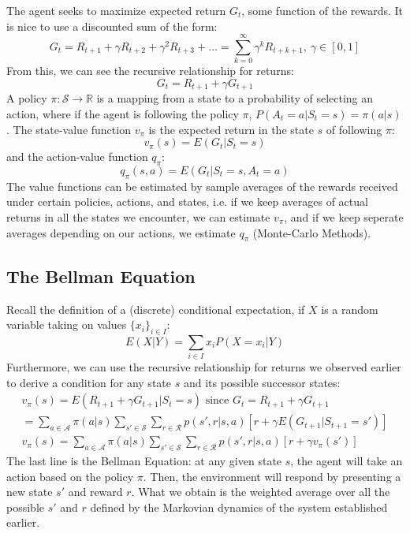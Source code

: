 \documentclass[12pt, reqno]{article}
\theoremstyle{plain}    \newtheorem{theorem}{Theorem}[section]
\theoremstyle{plain}    \newtheorem{lemma}[theorem]{Lemma}
\theoremstyle{plain}    \newtheorem{claim}[theorem]{Claim}
\theoremstyle{plain}    \newtheorem{definition}{Definition}[section]
\theoremstyle{plain}    \newtheorem{proposition}[theorem]{Proposition}
\theoremstyle{plain}    \newtheorem{corollary}[theorem]{Corollary}
\theoremstyle{plain}    \newtheorem{example}[definition]{Example}
\newcommand{\RR}{\mathbb R}
\numberwithin{equation}{section}
\begin{document}
The agent seeks to maximize expected return \(G_t\), some function of the
rewards. It is nice to use a discounted sum of the form:
\[G_t = R_{t+1} + \gamma R_{t+2} + \gamma^2 R_{t+3} + \dots =
\sum_{k=0}^{\infty}\gamma^k R_{t+k+1}, \ \gamma \in [0,1]\]
From this, we can see the recursive relationship for returns:
\[G_t = R_{t+1} + \gamma G_{t+1}\]
A policy \(\pi: \mathcal{S} \to \RR\) is a mapping from a state to a
probability of selecting an action, where if the agent is following the policy
\(\pi\), \(P(A_t = a | S_t = s) = \pi(a|s)\). The state-value function \(v_{\pi}\) is
the expected return in the state \(s\) of following \(\pi\): 
\[v_{\pi}(s) = E(G_t | S_t = s)\]
and the action-value function \(q_{\pi}\):
\[q_{\pi}(s,a) = E(G_t | S_t = s, A_t = a)\]
The value functions can be estimated by sample averages of the rewards received
under certain policies, actions, and states, i.e. if we keep averages of actual
returns in all the states we encounter, we can estimate \(v_{\pi}\), and if we keep seperate
averages depending on our actions, we estimate \(q_{\pi}\) (Monte-Carlo Methods).

\subsection{The Bellman Equation}
Recall the definition of a (discrete) conditional expectation, if \(X\) is a
random variable taking on values \(\{x_i\}_{i \in I}\):
\[E(X|Y) = \sum_{i \in I} x_i P(X=x_i | Y)\]
Furthermore, we can use the recursive relationship for returns we observed
earlier to derive a condition for any state \(s\) and its possible successor
states:
\begin{gather*}
	v_{\pi}(s) = E(R_{t+1} + \gamma G_{t+1}|S_t = s) \text{ since } G_t = R_{t+1} + \gamma G_{t+1} \\
	= \sum_{a \in \mathcal{A}}\pi(a|s) \sum_{s' \in \mathcal{S}} \sum_{r \in \mathcal{R}}p(s', r | s,a) \left[r + \gamma E(G_{t+1} | S_{t+1} = s') \right] \\
	\boxed{v_{\pi}(s) = \sum_{a \in \mathcal{A}}\pi(a|s) \sum_{s' \in \mathcal{S}} \sum_{r \in \mathcal{R}}p(s', r | s,a) [r + \gamma v_{\pi}(s')]}
\end{gather*}
The last line is the Bellman Equation: at any given state \(s\), the agent will
take an action based on the policy \(\pi\). Then, the environment will respond
by presenting a new state \(s'\) and reward \(r\). What we obtain is the
weighted average over all the possible \(s'\) and \(r\) defined by the Markovian
dynamics of the system established earlier.
\end{document}

